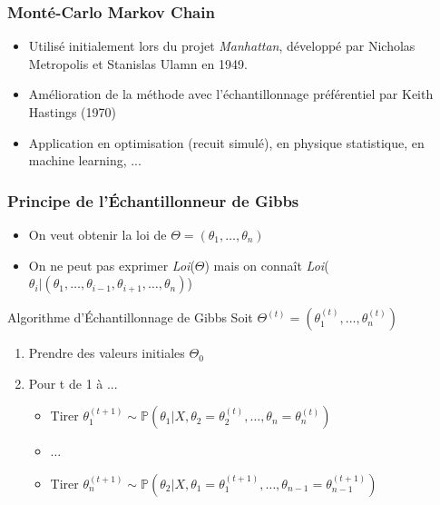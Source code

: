 

\begin{frame}
    
    \frametitle{Monté-Carlo Markov Chain}
        
    \begin{itemize}%
        \item Utilisé initialement lors du projet \textit{Manhattan}, développé par Nicholas Metropolis et Stanislas Ulamn en 1949.
        \item Amélioration de la méthode avec l'échantillonnage préférentiel par Keith Hastings (1970)
        \item Application en optimisation (recuit simulé), en physique statistique, en machine learning, ...
    \end{itemize}

\end{frame}

\begin{frame}
    \frametitle{Principe de l'\'Echantillonneur de Gibbs}
    \begin{itemize}%
    \item On veut obtenir la loi de $\Theta=\left(\theta_{1}, \ldots, \theta_{n}\right)$ \\
    \item On ne peut pas exprimer \textit{Loi}($\Theta$) mais on connaît \textit{Loi}($\theta_i | (\theta_{1}, \dots, \theta_{i-1}, \theta_{i+1}, \dots, \theta_{n})$) 
    
    \end{itemize}
    
    \begin{exampleblock}{Algorithme d'\'Echantillonnage de Gibbs}
        Soit $\Theta^{(t)} = \left(\theta^{(t)}_{1}, \ldots, \theta^{(t)}_{n}\right)$
        \begin{enumerate}
            \item Prendre des valeurs initiales $\Theta_0$
            \item Pour t de 1 à ...
            \begin{itemize}
                \item Tirer  $\theta_{1}^{(t+1)} \sim \mathbb{P}(\theta_{1} | X, \theta_{2}=\theta_{2}^{(t)}, \ldots, \theta_{n}=\theta_{n}^{(t)})$
                \item $\dots$
                \item Tirer $\theta_{n}^{(t+1)} \sim \mathbb{P}(\theta_{2} | X, \theta_{1}=\theta_{1}^{(t+1)}, \ldots, \theta_{n-1}=\theta_{n-1}^{(t+1)})$
            \end{itemize}
        \end{enumerate}
    \end{exampleblock}

\end{frame}

